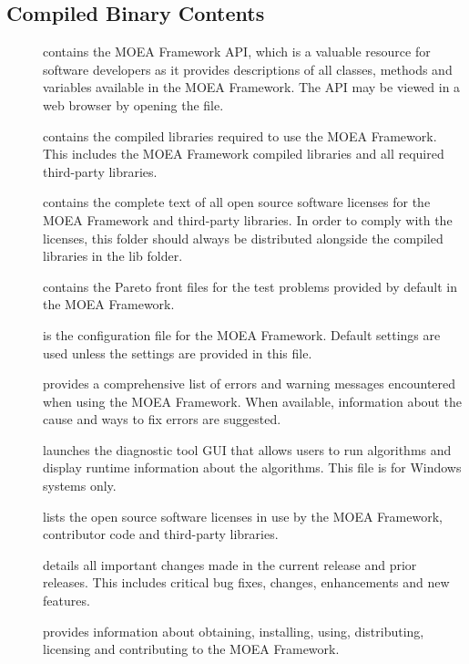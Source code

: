 \subsection{Compiled Binary Contents}
\begin{description}
  \item[] contains the MOEA Framework API, which is a valuable resource for software developers as it provides descriptions of all classes, methods and variables available in the MOEA Framework.  The API may be viewed in a web browser by opening the  file.
  \item[] contains the compiled libraries required to use the MOEA Framework.  This includes the MOEA Framework compiled libraries and all required third-party libraries.
  \item[] contains the complete text of all open source software licenses for the MOEA Framework and third-party libraries.  In order to comply with the licenses, this folder should always be distributed alongside the compiled libraries in the lib folder.
  \item[] contains the Pareto front files for the test problems provided by default in the MOEA Framework.
  \item[] is the configuration file for the MOEA Framework.  Default settings are used unless the settings are provided in this file.
  \item[] provides a comprehensive list of errors and warning messages encountered when using the MOEA Framework.  When available, information about the cause and ways to fix errors are suggested.
  \item[] launches the diagnostic tool GUI that allows users to run algorithms and display runtime information about the algorithms.  This file is for Windows systems only.
  \item[] lists the open source software licenses in use by the MOEA Framework, contributor code and third-party libraries.
  \item[] details all important changes made in the current release and prior releases.  This includes critical bug fixes, changes, enhancements and new features.
  \item[] provides information about obtaining, installing, using, distributing, licensing and contributing to the MOEA Framework.
\end{description}


